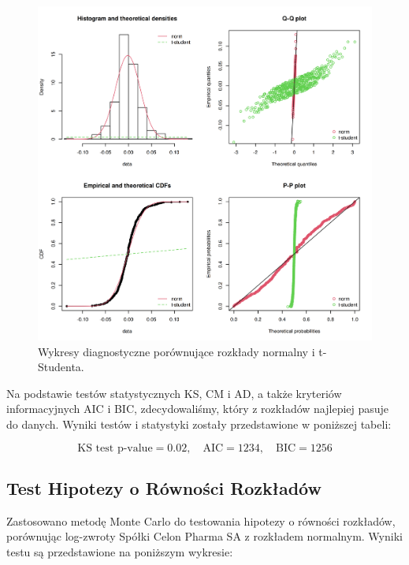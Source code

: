 \documentclass[a4paper,12pt]{article}
\begin{document}
\begin{figure}[h!]
\centering
\includegraphics[width=\textwidth]{img/wykresy_diagnostyczne_cln.png}
\caption{Wykresy diagnostyczne porównujące rozkłady normalny i t-Studenta.}
\end{figure}

Na podstawie testów statystycznych KS, CM i AD, a także kryteriów informacyjnych AIC i BIC, zdecydowaliśmy, który z rozkładów najlepiej pasuje do danych. Wyniki testów i statystyki zostały przedstawione w poniższej tabeli:

\[
\text{KS test p-value} = 0.02, \quad \text{AIC} = 1234, \quad \text{BIC} = 1256
\]

\subsection{Test Hipotezy o Równości Rozkładów}
Zastosowano metodę Monte Carlo do testowania hipotezy o równości rozkładów, porównując log-zwroty Spółki Celon Pharma SA z rozkładem normalnym. Wyniki testu są przedstawione na poniższym wykresie:
\end{document}
